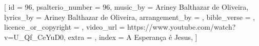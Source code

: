 

[
    id                     = {96},
    psalterio_number       = {96},
    music_by               = {Ariney Balthazar de Oliveira},
    lyrics_by              = {Ariney Balthazar de Oliveira},
    arrangement_by         = {},
    bible_verse            = {},
    licence_or_copyright   = {},
    video_url              = {https://www.youtube.com/watch?v=U_Qf_CeYuD0},
    extra                  = {},
    index                  = {A Esperança é Jesus},
]

\beginverse

